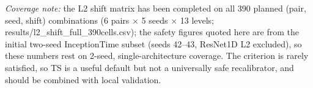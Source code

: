 \documentclass[review,12pt,nonatbib]{elsarticle}
\begin{document}
\emph{Coverage note:} the L2 shift matrix has been completed on all 390
planned (pair, seed, shift) combinations (6 pairs $\times$ 5 seeds
$\times$ 13 levels; results/l2\_shift\_full\_390cells.csv); the safety
figures quoted here are from the initial two-seed InceptionTime subset
(seeds 42--43, ResNet1D L2 excluded), so these numbers rest on 2-seed,
single-architecture coverage. The criterion is rarely satisfied, so TS is
a useful default but not a universally safe recalibrator, and should be
combined with local validation.
\end{document}
